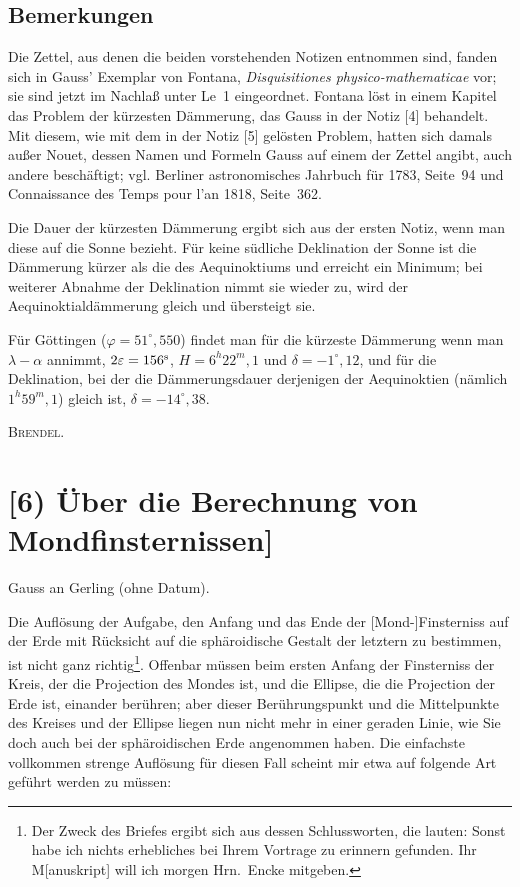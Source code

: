 \documentclass[12pt,a4paper]{article}
\theoremstyle{plain}
\theoremstyle{definition}
\theoremstyle{remark}
\begin{document}
\newpage

\subsection*{Bemerkungen}

Die Zettel, aus denen die beiden vorstehenden Notizen entnommen sind, fanden sich in Gauss' Exemplar von Fontana, \emph{Disquisitiones physico-mathematicae} vor; sie sind jetzt im Nachla\ss{} unter Le~1 eingeordnet. Fontana l\"ost in einem Kapitel das Problem der k\"urzesten D\"ammerung, das Gauss in der Notiz [4] behandelt. Mit diesem, wie mit dem in der Notiz [5] gel\"osten Problem, hatten sich damals au\ss er Nouet, dessen Namen und Formeln Gauss auf einem der Zettel angibt, auch andere besch\"aftigt; vgl. Berliner astronomisches Jahrbuch f\"ur 1783, Seite~94 und Connaissance des Temps pour l'an 1818, Seite~362.

Die Dauer der k\"urzesten D\"ammerung ergibt sich aus der ersten Notiz, wenn man diese auf die Sonne bezieht. F\"ur keine s\"udliche Deklination der Sonne ist die D\"ammerung k\"urzer als die des Aequinoktiums und erreicht ein Minimum; bei weiterer Abnahme der Deklination nimmt sie wieder zu, wird der Aequinoktiald\"ammerung gleich und \"ubersteigt sie.

F\"ur G\"ottingen ($\varphi = 51^{\circ}{,}550$) findet man f\"ur die k\"urzeste D\"ammerung wenn man $\lambda - \alpha$ annimmt, $2\varepsilon = 156^{\rm s}$, $H = 6^h22^m{,}1$ und $\delta = -1^{\circ}{,}12$, und f\"ur die Deklination, bei der die D\"ammerungsdauer derjenigen der Aequinoktien (n\"amlich $1^h59^m{,}1$) gleich ist, $\delta = -14^{\circ}{,}38$.

\hfill\textsc{Brendel}.

\newpage

\section*{[6) \"Uber die Berechnung von Mondfinsternissen]}

Gauss an Gerling (ohne Datum).

Die Aufl\"osung der Aufgabe, den Anfang und das Ende der [Mond-]Finsterniss auf der Erde mit R\"ucksicht auf die sph\"aroidische Gestalt der letztern zu bestimmen, ist nicht ganz richtig\footnote{Der Zweck des Briefes ergibt sich aus dessen Schlussworten, die lauten: \glqq Sonst habe ich nichts erhebliches bei Ihrem Vortrage zu erinnern gefunden. Ihr M[anuskript] will ich morgen Hrn.~Encke mitgeben.\grqq}. Offenbar m\"ussen beim ersten Anfang der Finsterniss der Kreis, der die Projection des Mondes ist, und die Ellipse, die die Projection der Erde ist, einander ber\"uhren; aber dieser Ber\"uhrungspunkt und die Mittelpunkte des Kreises und der Ellipse liegen nun nicht mehr in einer geraden Linie, wie Sie doch auch bei der sph\"aroidischen Erde angenommen haben. Die einfachste vollkommen strenge Aufl\"osung f\"ur diesen Fall scheint mir etwa auf folgende Art gef\"uhrt werden zu m\"ussen:
\end{document}
